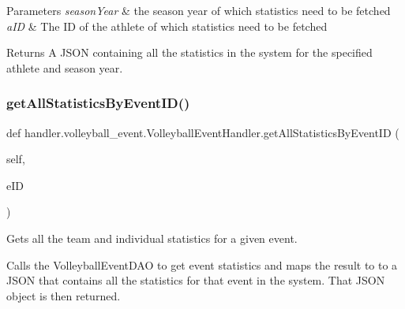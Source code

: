 \begin{DoxyParams}{Parameters}
{\em season\+Year} & the season year of which statistics need to be fetched \\
\hline
{\em a\+ID} & The ID of the athlete of which statistics need to be fetched\\
\hline
\end{DoxyParams}
\begin{DoxyReturn}{Returns}
A J\+S\+ON containing all the statistics in the system for the specified athlete and season year. 
\end{DoxyReturn}
\mbox{\label{classhandler_1_1volleyball__event_1_1_volleyball_event_handler_af0ca76458c344fc36594130a1506da2d}} 
\subsubsection{\texorpdfstring{get\+All\+Statistics\+By\+Event\+I\+D()}{getAllStatisticsByEventID()}}
{\footnotesize\ttfamily def handler.\+volleyball\+\_\+event.\+Volleyball\+Event\+Handler.\+get\+All\+Statistics\+By\+Event\+ID (\begin{DoxyParamCaption}\item[{}]{self,  }\item[{}]{e\+ID }\end{DoxyParamCaption})}



Gets all the team and individual statistics for a given event. 

Calls the Volleyball\+Event\+D\+AO to get event statistics and maps the result to to a J\+S\+ON that contains all the statistics for that event in the system. That J\+S\+ON object is then returned.



